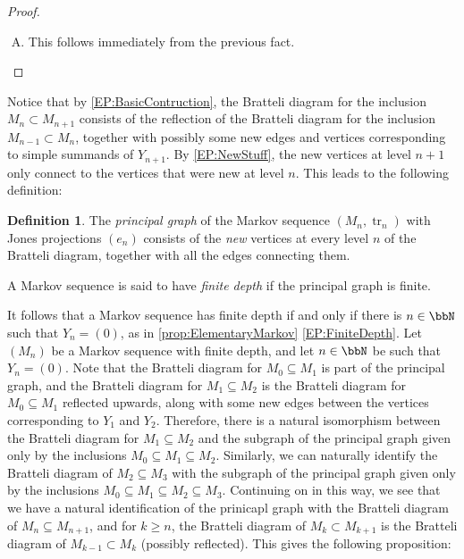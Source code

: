 \documentclass[11pt]{article}
\theoremstyle{plain}
\theoremstyle{definition}
\newtheorem{defn}[thm]{Definition}
\DeclareMathOperator{\tr}{tr}
\begin{document}
\begin{proof}
\begin{enumerate}[(A)]
\item

This follows immediately from the previous fact.

\end{enumerate}

\end{proof}


Notice that by \eqref{EP:BasicContruction}, the Bratteli diagram for the inclusion $M_{n}\subset M_{n+1}$ consists of the reflection of the Bratteli diagram for the inclusion $M_{n-1} \subset M_n$, together with possibly some new edges and vertices corresponding to simple summands of $Y_{n+1}$. By \eqref{EP:NewStuff}, the new vertices at level $n+1$ only connect to the vertices that were new at level $n$. This leads to the following definition:


\begin{defn}
The \emph{principal graph} of the Markov sequence $(M_n,\tr_n)$ with Jones projections $(e_n)$ consists of the \emph{new} vertices at every level $n$ of the Bratteli diagram, together with all the edges connecting them.

A Markov sequence is said to have \emph{finite depth} if the principal graph is finite.
\end{defn}


It follows that a Markov sequence has finite depth if and only if there is $n\in \bbN$ such that $Y_n = (0)$, as in \ref{prop:ElementaryMarkov} \eqref{EP:FiniteDepth}. Let $(M_n)$ be a Markov sequence with finite depth, and let $n\in \bbN$ be such that $Y_n=(0)$. 
Note that the Bratteli diagram for $M_0\subseteq M_1$ is part of the principal graph, and the Bratteli diagram for $M_1\subseteq M_2$ is the Bratteli diagram for $M_0\subseteq M_1$ reflected upwards, along with some new edges between the vertices corresponding to $Y_1$ and $Y_2$. Therefore, there is a natural isomorphism between the Bratteli diagram for $M_1\subseteq M_2$ and the subgraph of the principal graph given only by the inclusions $M_0\subseteq M_1\subseteq M_2$. Similarly, we can naturally identify the Bratteli diagram of $M_2\subseteq M_3$ with the subgraph of the principal graph given only by the inclusions $M_0\subseteq M_1\subseteq M_2\subseteq M_3$. Continuing on in this way, we see that we have a natural identification of the prinicapl graph with the Bratteli diagram of $M_n\subseteq M_{n+1}$, and for $k\geq n$, the Bratteli diagram of $M_{k}\subset M_{k+1}$ is the Bratteli diagram of $M_{k-1}\subset M_{k}$ (possibly reflected). %
This gives the following proposition:
\end{document}
